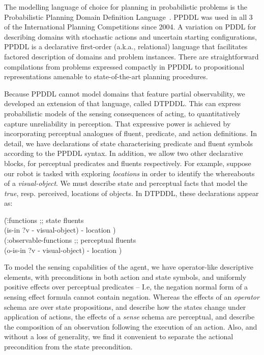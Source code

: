 
The modelling language of choice for planning in probabilistic
problems is the Probabilistic Planning Domain Definition
Language~\cite{younes:littman:04,younes:etal:2005}. PPDDL was used in
all 3 of the International Planning Competitions since 2004. A
variation on PDDL for describing domains with stochastic actions and
uncertain starting configurations, PPDDL is a declarative first-order
(a.k.a., relational) language that facilitates factored description of
domains and problem instances. There are straightforward compilations
from problems expressed compactly in PPDDL to propositional
representations amenable to state-of-the-art planning procedures.

Because PPDDL cannot model domains that feature partial observability,
we developed an extension of that language, called DTPDDL. This can
express probabilistic models of the sensing consequences of acting, to
quantitatively capture unreliability in perception. That expressive
power is achieved by incorporating perceptual analogues of fluent,
predicate, and action definitions. In detail, we have declarations of
state characterising predicate and fluent symbols according to the
PPDDL syntax. In addition, we allow two other declarative blocks, for
perceptual predicates and fluents respectively. For example, suppose
our robot is tasked with exploring {\em locations} in order to
identify the whereabouts of a {\em visual-object}. We must describe
state and perceptual facts that model the {\em true}, resp. perceived,
locations of objects. In DTPDDL, these declarations appear as:

\small
\begin{tabtt}
(\=:functions  ;; state fluents\\
  \> (is-in ?v - visual-object) - location )\\
(:observable-functions  ;; perceptual fluents\\
  \> (o-is-in ?v - visual-object) - location )
\end{tabtt}
\normalsize

\noindent To model the sensing capabilities of the agent, we have
operator-like descriptive elements, with preconditions in both action
and state symbols, and uniformly positive effects over perceptual
predicates -- I.e, the negation normal form of a sensing effect
formula cannot contain negation. Whereas the effects of an {\em
operator} schema are over state propositions, and describe how the
states change under application of actions, the effects of a {\em
sense} schema are perceptual, and describe the composition of an
observation following the execution of an action. Also, and without a
loss of generality, we find it convenient to separate the actional
precondition from the state precondition. 

